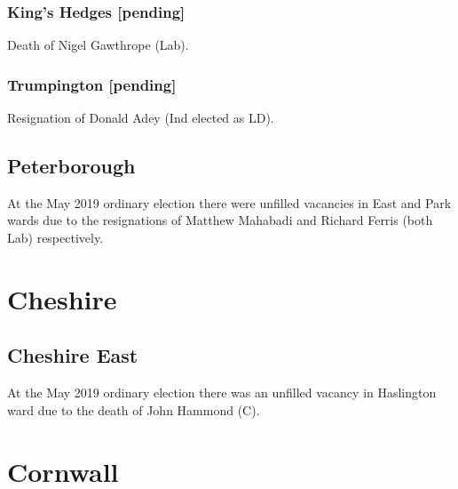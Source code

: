 \documentclass[a4paper,openany]{book}
\begin{document}
\begin{resultsiii}
\subsubsection*{King's Hedges \hspace*{\fill}\nolinebreak[1]%
	\enspace\hspace*{\fill}
	[pending]}


Death of Nigel Gawthrope (Lab).

\subsubsection*{Trumpington \hspace*{\fill}\nolinebreak[1]%
	\enspace\hspace*{\fill}
	[pending]}


Resignation of Donald Adey (Ind elected as LD).

\subsection*{Peterborough}

At the May 2019 ordinary election there were unfilled vacancies in East and Park wards due to the resignations of Matthew Mahabadi and Richard Ferris (both Lab) respectively.

\section{Cheshire}

\subsection*{Cheshire East}

At the May 2019 ordinary election there was an unfilled vacancy in Haslington ward due to the death of John Hammond (C).

\section{Cornwall}


\end{resultsiii}
\end{document}
